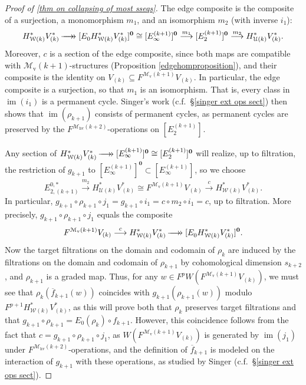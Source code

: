 \documentclass[11pt]{amsart} \renewcommand{\baselinestretch}{1.4}
\theoremstyle{plain}
\theoremstyle{definition}
\DeclareMathOperator{\im}{im}
\renewcommand{\to}{\longrightarrow}
\newcommand{\calU}{\mathcal{U}}
\newcommand{\calw}{\mathcal{W}}
\newcommand{\calMv}{\mathcal{M}\dver}
\newcommand{\calMhv}{\mathcal{M}_\mathrm{hv}}
\newcommand{\epi}{{\,\makebox[0cm][l]{\ensuremath\to}\to{}}}
\newcommand{\E}[5]{[E^{#1}_{#2}#3]^{#4}_{#5}}
\newcommand{\dver}{_\mathrm{v}}
\begin{document}
\begin{Calculations of HWn for n nonzero}
\begin{proof}[Proof of \ref{thm on collapsing of most sseqs}]
The edge composite is the composite of a surjection, a monomorphism $m_1$, and an isomorphism $m_2$ (with inverse $i_1$):
\[H^*_{\calw(k)}V^*_{(k)}\epi 
\E{}{0}{H^*_{\calw(k)}V^*_{(k)}}{\textbf{0}}{}
\cong
\E{(k+1)}{\infty}{}{\textbf{0}}{}
\overset{m_1}{\to} \E{(k+1)}{2}{}{\textbf{0}}{}
\overset{m_2}{\to}H^*_{\calU(k)}V^*_{(k)}.\]
Moreover, $c$ is a section of the edge composite, since both maps are compatible with $\calMv(k+1)$-structures (Proposition \ref{edgehomproposition}), and their composite is the identity on $V_{(k)}\subseteq  F^{\calMv(k+1)}V_{(k)}$.
In particular, the edge composite is a surjection, so that $m_{1}$ is an isomorphism. That is, every class in $\im(i_1)$ is a permanent cycle. Singer's work (c.f.\ \S\ref{singer ext ops sect}) then shows that $\im(\rho_{k+1})$ consists of permanent cycles, as permanent cycles are preserved by the $F^{\calMhv(k+2)}$-operations on $\E{(k+1)}{2}{}{}{}$.


Any section of $H^*_{\calw(k)}V^*_{(k)}\epi \E{(k+1)}{\infty}{}{\textbf{0}}{}\cong \E{(k+1)}{2}{}{\textbf{0}}{} $ will realize, up to filtration, the restriction of $g_{k+1}$ to $\E{(k+1)}{\infty}{}{\textbf{0}}{} \subset \E{(k+1)}{\infty}{}{}{}$, so we choose
\[E_{2,(k+1)}^{0,*}\overset{m_2}{\to} H^*_{\calU(k)}V^*_{(k)}\cong F^{\calMv(k+1)}V_{(k)}\overset{c}{\to}H^*_{\calw(k)}V^*_{(k)}.\]
In particular, $g_{k+1}\circ \rho_{k+1}\circ j_1=g_{k+1}\circ i_1=c\circ m_2\circ i_1=c$, up to filtration. More precisely, $g_{k+1}\circ \rho_{k+1}\circ j_1$ equals the composite
\[
F^{\calMv(k+1)}V_{(k)}\overset{c}{\to} H^*_{\calw(k)}V^*_{(k)}\epi \E{}{0}{H^*_{\calw(k)}V^*_{(k)}}{\textbf{0}}{}.
\]
Now the target filtrations on the domain and codomain of $\rho_k$ are induced by the filtrations on the domain and codomain of $\rho_{k+1}$ by cohomological dimension $s_{k+2}$, and $\rho_{k+1}$ is a graded map. Thus, for any $w\in F^pW(F^{\calMv(k+1)}V_{(k)})$, we must see that $\rho_k(\overline{f}_{k+1}(w))$ coincides with $g_{k+1}(\rho_{k+1}(w))$ modulo $F^{p+1}H^*_{\calw(k)}V^*_{(k)}$, as this will prove both that $\rho_k$ preserves target filtrations and that  $g_{k+1}\circ \rho_{k+1}=E_0(\rho_{k})\circ f_{k+1}$. However, this coincidence follows from the fact that $c=g_{k+1}\circ \rho_{k+1}\circ j_1$, as $W(F^{\calMv(k+1)}V_{(k)})$ is generated by $\im(j_1)$ under $F^{\calMhv(k+2)}$-operations, and the definition of $\overline{f}_{k+1}$ is modeled on the interaction of $g_{k+1}$ with these operations, as studied by Singer (c.f.\ \S\ref{singer ext ops sect}).


\end{proof}
\end{Calculations of HWn for n nonzero}
\end{document}
